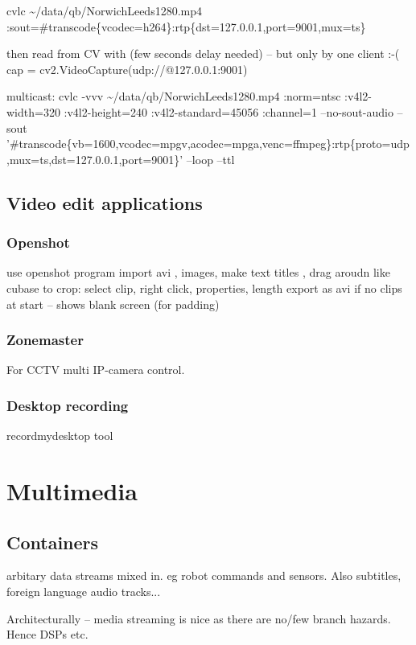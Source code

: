 \documentclass[oneside,english]{scrbook}
\begin{document}
cvlc \textasciitilde{}/data/qb/NorwichLeeds1280.mp4 :sout=\#transcode\{vcodec=h264\}:\textquotedbl{}rtp\{dst=127.0.0.1,port=9001,mux=ts\}\textquotedbl{}

then read from CV with (few seconds delay needed) -- but only by one
client :-( cap = cv2.VideoCapture(\textquotedbl{}udp://@127.0.0.1:9001\textquotedbl{})

multicast: cvlc -vvv \textasciitilde{}/data/qb/NorwichLeeds1280.mp4
:norm=ntsc :v4l2-width=320 :v4l2-height=240 :v4l2-standard=45056 :channel=1
--no-sout-audio --sout '\#transcode\{vb=\textquotedbl{}1600\textquotedbl{},vcodec=mpgv,acodec=mpga,venc=ffmpeg\}:rtp\{proto=udp,mux=ts,dst=127.0.0.1,port=9001\}'
--loop --ttl 

\chapter{Video edit applications}
\section{Openshot}
use openshot program
	import avi , images, make text titles , drag aroudn like cubase
	to crop: select clip, right click, properties, length
	export as avi
	if no clips at start -- shows blank screen (for padding)

\section{Zonemaster}
For CCTV multi IP-camera control.

\section{Desktop recording}
recordmydesktop tool




\part{Multimedia}


\chapter{Containers}

arbitary data streams mixed in. eg robot commands and sensors. Also
subtitles, foreign language audio tracks...

Architecturally -- media streaming is nice as there are no/few branch hazards. Hence DSPs etc.
\end{document}
